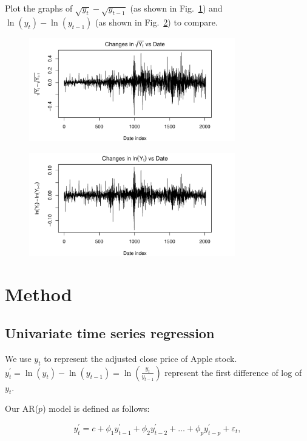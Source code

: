 \documentclass[conference,onecolumn,11pt]{IEEEtran}
\begin{document}
Plot the graphs of $\sqrt{y_t}-\sqrt{y_{t-1}}$ (as shown in Fig.~\ref{fig:dsqrt}) and $\ln(y_t)-\ln(y_{t-1})$ (as shown in Fig.~\ref{fig:dlog}) to compare. 

\begin{figure}[htpb]
	\centering
	\includegraphics[width=0.8\textwidth]{pic/Sqrt_AdjClosed.pdf}
	\caption{}
	\label{fig:dsqrt}
\end{figure}

\begin{figure}[htpb]
	\centering
	\includegraphics[width=0.8\textwidth]{pic/log_AdjClosed.pdf}
	\caption{}
	\label{fig:dlog}
\end{figure}


\section{Method}

\subsection*{Univariate time series regression}

We use $y_{t}$ to represent the adjusted close price of Apple stock.
$y^{'}_{t} = \ln(y_{t})-\ln(y_{t-1}) = \ln(\frac{y_{t}}{y_{t-1}})$ represent the first difference of log of $y_{t}$.


Our AR($p$) model is defined as follows:

\[
y^{'}_{t} = c + \phi_{1}y^{'}_{t-1} + \phi_{2}y^{'}_{t-2} + \dots + \phi_{p}y^{'}_{t-p} + \varepsilon_{t},
\]
\end{document}
